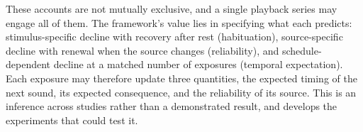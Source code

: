 These accounts are not mutually exclusive, and a single playback series may engage all of them. The framework's value lies in specifying what each predicts: stimulus-specific decline with recovery after rest (habituation), source-specific decline with renewal when the source changes (reliability), and schedule-dependent decline at a matched number of exposures (temporal expectation). Each exposure may therefore update three quantities, the expected timing of the next sound, its expected consequence, and the reliability of its source. This is an inference across studies rather than a demonstrated result, and  develops the experiments that could test it.

